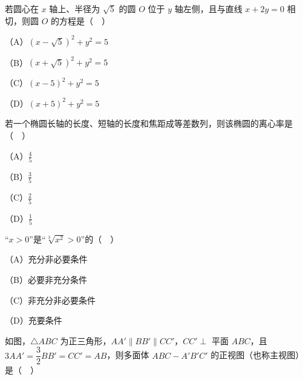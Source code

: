 \begin{question}
若圆心在 $x$ 轴上、半径为 $\sqrt5$ 的圆 $O$ 位于 $y$ 轴左侧，且与直线 $x+2y=0$ 相切，则圆 $O$ 的方程是（　）

（A）$(x-\sqrt5)^2+y^2=5$

（B）$(x+\sqrt5)^2+y^2=5$

（C）$(x-5)^2+y^2=5$

（D）$(x+5)^2+y^2=5$

\end{question}
\begin{question}
若一个椭圆长轴的长度、短轴的长度和焦距成等差数列，则该椭圆的离心率是（　）

（A）$\frac45$

（B）$\frac35$

（C）$\frac25$

（D）$\frac15$

\end{question}
\begin{question}
“$x>0$”是“$\sqrt[3]{x^2}>0$”的（　）

（A）充分非必要条件

（B）必要非充分条件

（C）非充分非必要条件

（D）充要条件

\Needspace{0.4\textheight}
\end{question}
\begingroup
\renewenvironment{question}{\Needspace{0.5\textheight}}{}
\begin{question}
如图，$\triangle ABC$ 为正三角形，$AA'\parallel BB'\parallel CC'$，$CC'\perp$ 平面 $ABC$，且 $3AA'=\dfrac32BB'=CC'=AB$，则多面体 $ABC-A'B'C'$ 的正视图（也称主视图）是（　）
\nopagebreak[4]
\begin{center}\end{center}
\nopagebreak[4]
\nopagebreak[4]
\begin{center}\end{center}
\nopagebreak[4]
\end{question}
\endgroup
